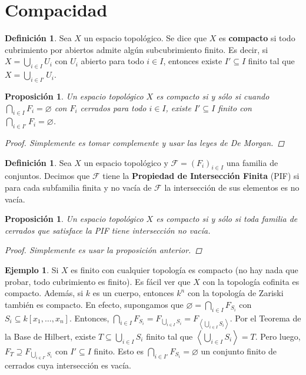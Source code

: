 \documentclass[12pt]{book}
\newtheorem{prop}[teo]{Proposición}
\theoremstyle{definition}
\newtheorem{defn}[teo]{Definición}
\newtheorem{ex}[teo]{Ejemplo}
\let\emptyset\varnothing
\begin{document}
\section{Compacidad}

\begin{defn}
Sea $X$ un espacio topológico. Se dice que $X$ es \textbf{compacto} si todo cubrimiento por abiertos admite algún subcubrimiento finito. Es decir, si $X = \displaystyle\bigcup_{i\in I}U_i$ con $U_i$ abierto para todo $i\in I$, entonces existe $I'\subseteq I$ finito tal que $X=\displaystyle\bigcup_{i\in I'} U_i$.
\end{defn}

\begin{prop}
Un espacio topológico $X$ es compacto si y sólo si cuando $\displaystyle\bigcap_{i\in I}F_i = \emptyset$ con $F_i$ cerrados para todo $i\in I$, existe $I'\subseteq I$ finito con $\displaystyle\bigcap_{i\in I'}F_i = \emptyset$.
\begin{proof}
Simplemente es tomar complemente y usar las leyes de De Morgan.
\end{proof}
\end{prop}

\begin{defn}
Sea $X$ un espacio topológico y $\mathscr{F}=(F_i)_{i\in I}$ una familia de conjuntos. Decimos que $\mathscr{F}$ tiene la \textbf{Propiedad de Intersección Finita} (PIF) si para cada subfamilia finita y no vacía de $\mathscr{F}$ la intersección de sus elementos es no vacía.
\end{defn}

\begin{prop}
Un espacio topológico $X$ es compacto si y sólo si toda familia de cerrados que satisface la PIF tiene intersección no vacía.
\begin{proof}
Simplemente es usar la proposición anterior.
\end{proof}
\end{prop}

\begin{ex}
Si $X$ es finito con cualquier topología es compacto (no hay nada que probar, todo cubrimiento es finito). Es fácil ver que $X$ con la topología cofinita es compacto. Además, si $k$ es un cuerpo, entonces $k^n$ con la topología de Zariski también es compacto. En efecto, supongamos que $\emptyset = \displaystyle\bigcap_{i\in I} F_{S_i}$ con $S_i\subseteq k[x_1,\ldots,x_n]$. Entonces, $\displaystyle\bigcap_{i\in I}F_{S_i} = F_{\bigcup_{i\in I}S_i} = F_{\left\langle \bigcup_{i\in I}S_i\right\rangle}$. Por el Teorema de la Base de Hilbert, existe $T\subseteq\displaystyle\bigcup_{i\in I}S_i$ finito tal que $\left\langle\displaystyle\bigcup_{i\in I}S_i\right\rangle = T$. Pero luego, $F_T\supseteq F_{\bigcup_{i\in I'}S_i}$ con $I'\subseteq I$ finito. Esto es $\displaystyle\bigcap_{i\in I'}F_{S_i}=\emptyset$ un conjunto finito de cerrados cuya intersección es vacía.
\end{ex}
\end{document}
